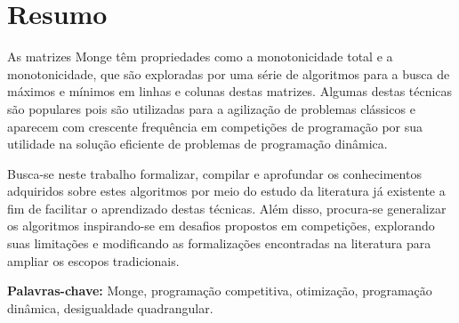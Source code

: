 \chapter*{Resumo}
\label{Resumo}

As matrizes Monge têm propriedades como a monotonicidade total e a monotonicidade, que são exploradas por uma série de algoritmos para a busca de máximos e mínimos em linhas e colunas destas matrizes. Algumas destas técnicas são populares pois são utilizadas para a agilização de problemas clássicos e aparecem com crescente frequência em competições de programação por sua utilidade na solução eficiente de problemas de programação dinâmica.

Busca-se neste trabalho formalizar, compilar e aprofundar os conhecimentos adquiridos sobre estes algoritmos por meio do estudo da literatura já existente a fim de facilitar o aprendizado destas técnicas. Além disso, procura-se generalizar os algoritmos inspirando-se em desafios propostos em competições, explorando suas limitações e modificando as formalizações encontradas na literatura para ampliar os escopos tradicionais. 

\textbf{Palavras-chave:} Monge, programação competitiva, otimização, programação dinâmica, desigualdade quadrangular.

%
%
%
